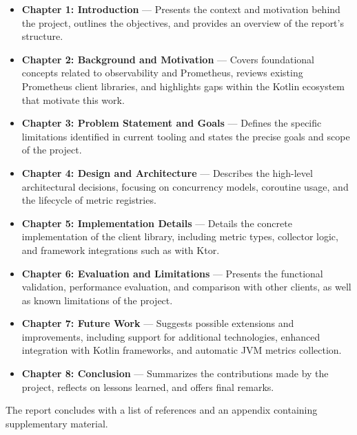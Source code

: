 \begin{itemize}
    \item \textbf{Chapter 1: Introduction} — Presents the context and motivation behind the project, outlines the objectives, and provides an overview of the report’s structure.

    \item \textbf{Chapter 2: Background and Motivation} — Covers foundational concepts related to observability and Prometheus, reviews existing Prometheus client libraries, and highlights gaps within the Kotlin ecosystem that motivate this work.

    \item \textbf{Chapter 3: Problem Statement and Goals} — Defines the specific limitations identified in current tooling and states the precise goals and scope of the project.

    \item \textbf{Chapter 4: Design and Architecture} — Describes the high-level architectural decisions, focusing on concurrency models, coroutine usage, and the lifecycle of metric registries.

    \item \textbf{Chapter 5: Implementation Details} — Details the concrete implementation of the client library, including metric types, collector logic, and framework integrations such as with Ktor.

    \item \textbf{Chapter 6: Evaluation and Limitations} — Presents the functional validation, performance evaluation, and comparison with other clients, as well as known limitations of the project.

    \item \textbf{Chapter 7: Future Work} — Suggests possible extensions and improvements, including support for additional technologies, enhanced integration with Kotlin frameworks, and automatic JVM metrics collection.

    \item \textbf{Chapter 8: Conclusion} — Summarizes the contributions made by the project, reflects on lessons learned, and offers final remarks.
\end{itemize}

The report concludes with a list of references and an appendix containing supplementary material.
